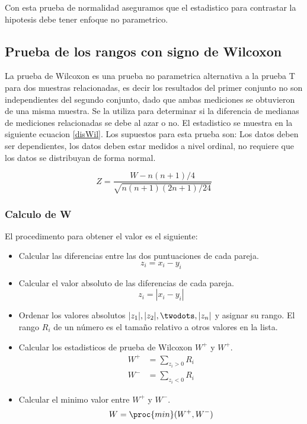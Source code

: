 Con esta prueba de normalidad aseguramos que el estadistico para contrastar la hipotesis debe tener enfoque no parametrico.

\subsection{Prueba de los rangos con signo de Wilcoxon}
La prueba de Wilcoxon es una prueba no parametrica alternativa a la prueba T para dos muestras relacionadas, es decir los resultados del primer conjunto no son independientes del segundo conjunto, dado que ambas mediciones se obtuvieron de una misma muestra. Se la utiliza para determinar si la diferencia de medianas de mediciones relacionadas se debe al azar o no. El estadistico se muestra en la siguiente ecuacion \ref{disWil}. Los supuestos para esta prueba son: Los datos deben ser dependientes, los datos deben estar medidos a nivel ordinal, no requiere que los datos se distribuyan de forma normal.

\begin{equation}
Z = \frac{W-n(n+1)/4}{\sqrt{n(n+1)(2n+1)/24}}
\label{disWil}
\end{equation}

\subsubsection{Calculo de W}
El procedimento para obtener el valor  es el siguiente:
\begin{itemize}
  \item Calcular las diferencias entre las dos puntuaciones de cada pareja.
  \begin{equation*}
    z_i = x_i - y_i
  \end{equation*}
  \item Calcular el valor absoluto de las diferencias de cada pareja.
  \begin{equation*}
    z_i = |x_i - y_i|
  \end{equation*}
  \item Ordenar los valores absolutos $|z_1|,|z_2|,\twodots,|z_n|$ y asignar su rango. El rango $R_i$ de un número es el tamaño relativo a otros valores en la lista.
  \item Calcular los estadisticos de prueba de Wilcoxon $W^{+}$ y $W^{+}$.
  \begin{equation*}
  \begin{split}
  W^{+} & = \sum_{z_i>0}{R_i} \\
  W^{-} & = \sum_{z_i<0}{R_i}
  \end{split}
  \end{equation*}
  \item Calcular el minimo valor entre $W^{+}$ y $W^{-}$.
  \begin{equation*}
    W=\proc{min}(W^{+}, W^{-})
  \end{equation*}
\end{itemize}

